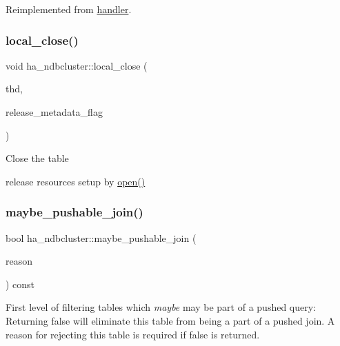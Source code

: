Reimplemented from \mbox{\hyperlink{classhandler_a39c5919d6a3f3098353f4517e2c81037}{handler}}.

\mbox{\label{classha__ndbcluster_ac5921b0992ea58b7698d649fcc7d50c1}} 
\subsubsection{\texorpdfstring{local\+\_\+close()}{local\_close()}}
{\footnotesize\ttfamily void ha\+\_\+ndbcluster\+::local\+\_\+close (\begin{DoxyParamCaption}\item[{T\+HD $\ast$}]{thd,  }\item[{bool}]{release\+\_\+metadata\+\_\+flag }\end{DoxyParamCaption})}

Close the table
\begin{DoxyItemize}
\item release resources setup by \mbox{\hyperlink{classha__ndbcluster_a5e1e0e1c8aa3764c955f46b8845b7a1a}{open()}} 
\end{DoxyItemize}\mbox{\label{classha__ndbcluster_a90a74f871433b2534301b2b9ac6aecbf}} 
\subsubsection{\texorpdfstring{maybe\+\_\+pushable\+\_\+join()}{maybe\_pushable\_join()}}
{\footnotesize\ttfamily bool ha\+\_\+ndbcluster\+::maybe\+\_\+pushable\+\_\+join (\begin{DoxyParamCaption}\item[{const char $\ast$\&}]{reason }\end{DoxyParamCaption}) const}

First level of filtering tables which {\itshape maybe} may be part of a pushed query\+: Returning \textquotesingle{}false\textquotesingle{} will eliminate this table from being a part of a pushed join. A \textquotesingle{}reason\textquotesingle{} for rejecting this table is required if \textquotesingle{}false\textquotesingle{} is returned. \mbox{\label{classha__ndbcluster_af561f07d996700a18cd0eb636a14f32e}} 
